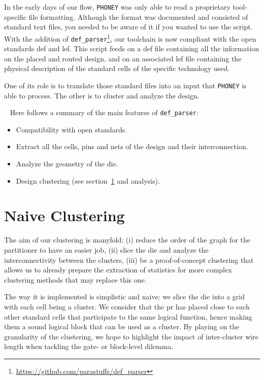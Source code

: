 \documentclass[11pt,a4paper]{report} %
\theoremstyle{customdef}
\begin{document}
In the early days of our flow, \texttt{PHONEY} was only able to read a proprietary tool-specific file formatting.
Although the format was documented and consisted of standard text files, you needed to be aware of it if you wanted to use the script.
With the addition of \texttt{def\_parser}\footnote{\url{https://github.com/parastuffs/def_parser}}, our toolchain is now compliant with the open standards \gls{def} and \gls{lef}.
This script feeds on a \gls{def} file containing all the information on the placed and routed design, and on an associated \gls{lef} file containing the physical description of the standard cells of the specific technology used.

One of its role is to translate those standard files into an input that \texttt{PHONEY} is able to process.
The other is to cluster and analyze the design.

~\newline{}
Here follows a summary of the main features of \texttt{def\_parser}:
\begin{itemize}
	\item Compatibility with open standards.
	\item Extract all the cells, pins and nets of the design and their interconnection.
	\item Analyze the geometry of the die.
	\item Design clustering (see section~\ref{sec:clustering} and analysis).
\end{itemize}


\section{Naive Clustering}\label{sec:clustering}

The aim of our clustering is manyfold: (i) reduce the order of the graph for the partitioner to have an easier job, (ii) slice the die and analyze the interconnectivity between the clusters, (iii) be a proof-of-concept clustering that allows us to already prepare the extraction of statistics for more complex clustering methods that may replace this one.

The way it is implemented is simplistic and naive: we slice the die into a grid with each cell being a cluster.
We consider that the \gls{pr} has placed close to each other standard cells that participate to the same logical function, hence making them a sound logical block that can be used as a cluster.
By playing on the granularity of the clustering, we hope to highlight the impact of inter-cluster wire length when tackling the gate- or block-level dilemma.
\end{document}

